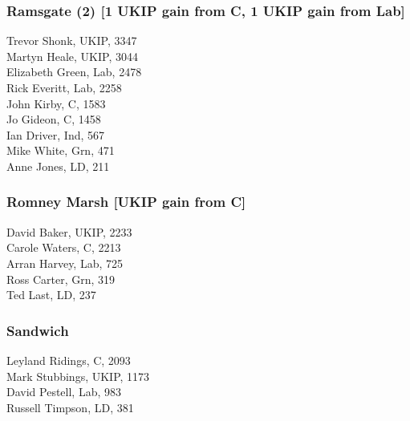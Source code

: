 \documentclass[a4paper,openany,10pt]{book}
\begin{document}
\subsubsection*{Ramsgate (2) \hspace*{\fill}\nolinebreak[1]%
\enspace\hspace*{\fill}
[1 UKIP gain from C, 1 UKIP gain from Lab]}



Trevor Shonk, UKIP, 3347\\
Martyn Heale, UKIP, 3044\\
Elizabeth Green, Lab, 2478\\
Rick Everitt, Lab, 2258\\
John Kirby, C, 1583\\
Jo Gideon, C, 1458\\
Ian Driver, Ind, 567\\
Mike White, Grn, 471\\
Anne Jones, LD, 211\\


\subsubsection*{Romney Marsh \hspace*{\fill}\nolinebreak[1]%
\enspace\hspace*{\fill}
[UKIP gain from C]}



David Baker, UKIP, 2233\\
Carole Waters, C, 2213\\
Arran Harvey, Lab, 725\\
Ross Carter, Grn, 319\\
Ted Last, LD, 237\\


\subsubsection*{Sandwich}



Leyland Ridings, C, 2093\\
Mark Stubbings, UKIP, 1173\\
David Pestell, Lab, 983\\
Russell Timpson, LD, 381\\
\end{document}
